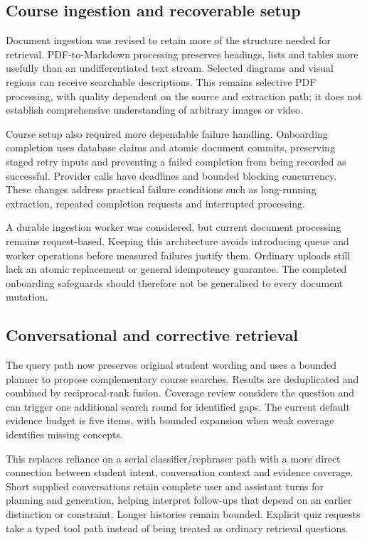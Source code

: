 \documentclass[11pt,a4paper]{article}
\begin{document}
\subsection{Course ingestion and recoverable setup}
Document ingestion was revised to retain more of the structure needed for retrieval. PDF-to-Markdown processing preserves headings, lists and tables more usefully than an undifferentiated text stream. Selected diagrams and visual regions can receive searchable descriptions. This remains selective PDF processing, with quality dependent on the source and extraction path; it does not establish comprehensive understanding of arbitrary images or video.

Course setup also required more dependable failure handling. Onboarding completion uses database claims and atomic document commits, preserving staged retry inputs and preventing a failed completion from being recorded as successful. Provider calls have deadlines and bounded blocking concurrency. These changes address practical failure conditions such as long-running extraction, repeated completion requests and interrupted processing.

A durable ingestion worker was considered, but current document processing remains request-based. Keeping this architecture avoids introducing queue and worker operations before measured failures justify them. Ordinary uploads still lack an atomic replacement or general idempotency guarantee. The completed onboarding safeguards should therefore not be generalised to every document mutation.

\subsection{Conversational and corrective retrieval}
The query path now preserves original student wording and uses a bounded planner to propose complementary course searches. Results are deduplicated and combined by reciprocal-rank fusion. Coverage review considers the question and can trigger one additional search round for identified gaps. The current default evidence budget is five items, with bounded expansion when weak coverage identifies missing concepts.

This replaces reliance on a serial classifier/rephraser path with a more direct connection between student intent, conversation context and evidence coverage. Short supplied conversations retain complete user and assistant turns for planning and generation, helping interpret follow-ups that depend on an earlier distinction or constraint. Longer histories remain bounded. Explicit quiz requests take a typed tool path instead of being treated as ordinary retrieval questions.
\end{document}
